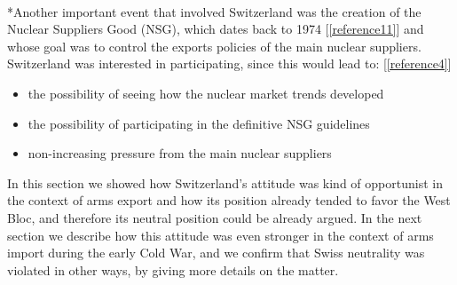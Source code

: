 \documentclass[a4paper]{article}
\begin{document}
\\*Another important event that involved Switzerland was the creation of the Nuclear Suppliers Good (NSG), which dates back to 1974 [\ref{reference11}] and whose goal was to control the exports policies of the main nuclear suppliers. Switzerland was interested in participating, since this would lead to: [\ref{reference4}] 
\begin{itemize}
\item{the possibility of seeing how the nuclear market trends developed}
\item{the possibility of participating in the definitive NSG guidelines}
\item{non-increasing pressure from the main nuclear suppliers}
\end{itemize}
In this section we showed how Switzerland's attitude was kind of opportunist in the context of arms export and how its position already tended to favor the West Bloc, and therefore its neutral position could be already argued. In the next section we describe how this attitude was even stronger in the context of arms import during the early Cold War, and we confirm that Swiss neutrality was violated in other ways, by giving more details on the matter.
\end{document}
